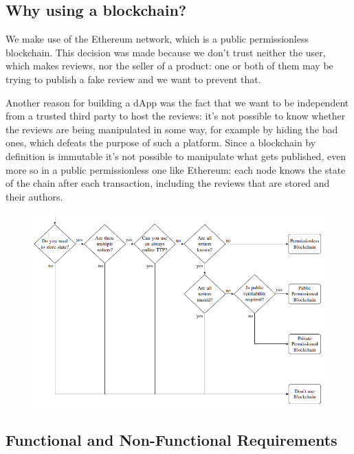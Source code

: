 \documentclass[12pt,a4paper,oneside]{article}
\theoremstyle{definition}
\begin{document}
\subsection{Why using a blockchain?}
We make use of the Ethereum network, which is a public permissionless blockchain. This decision was made because we don't trust neither the user, which makes reviews, nor the seller of a product: one or both of them may be trying to publish a fake review and we want to prevent that.

Another reason for building a dApp was the fact that we want to be independent from a trusted third party to host the reviews: it's not possible to know whether the reviews are being manipulated in some way, for example by hiding the bad ones, which defeats the purpose of such a platform. Since a blockchain by definition is immutable it's not possible to manipulate what gets published, even more so in a public permissionless one like Ethereum: each node knows the state of the chain after each transaction, including the reviews that are stored and their authors.

\begin{figure}[H]
	\centering
	\includegraphics[width=0.75\linewidth]{figures/should-use-blockhain.png}
\end{figure}

%

\subsection{Functional and Non-Functional Requirements}
\end{document}
